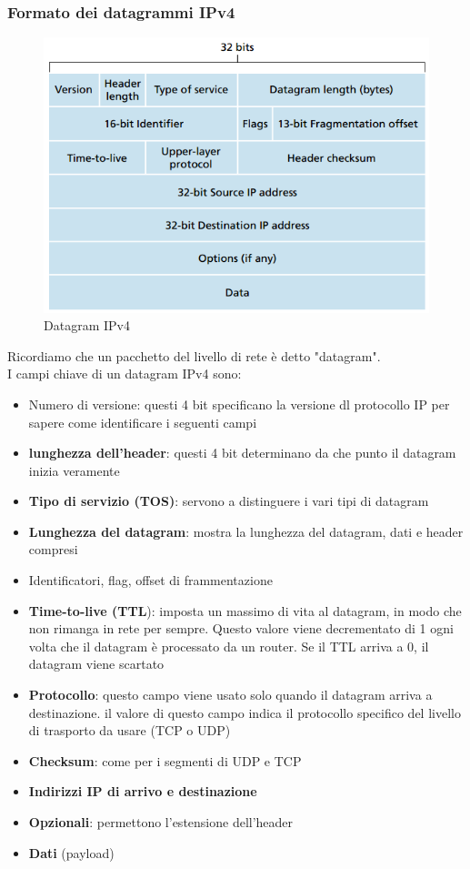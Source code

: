 \documentclass[11pt,a4paper]{article}
\begin{document}
\subsubsection{Formato dei datagrammi IPv4}
\begin{figure}
	\includegraphics[scale=0.6]{img/052.png}
	\caption{Datagram IPv4}
\end{figure}
Ricordiamo che un pacchetto del livello di rete è detto "datagram". \\
I campi chiave di un datagram IPv4 sono:
\begin{itemize}
	\item Numero di versione: questi 4 bit specificano la versione dl protocollo IP per sapere come identificare i seguenti campi
	\item \textbf{lunghezza dell'header}: questi 4 bit determinano da che punto il datagram inizia veramente
	\item \textbf{Tipo di servizio (TOS)}: servono a distinguere i vari tipi di datagram
	\item\textbf{ Lunghezza del datagram}: mostra la lunghezza del datagram, dati e header compresi
	\item Identificatori, flag, offset di frammentazione
	\item \textbf{Time-to-live (TTL}): imposta un massimo di vita al datagram, in modo che non rimanga in rete per sempre. Questo valore viene decrementato di 1 ogni volta che il datagram è processato da un router. Se il TTL arriva a 0, il datagram viene scartato
	\item \textbf{Protocollo}: questo campo viene usato solo quando il datagram arriva a destinazione. il valore di questo campo indica il protocollo specifico del livello di trasporto da usare (TCP o UDP)
	\item \textbf{Checksum}: come per i segmenti di UDP e TCP
	\item \textbf{Indirizzi IP di arrivo e destinazione}
	\item \textbf{Opzionali}: permettono l'estensione dell'header
	\item \textbf{Dati} (payload)
\end{itemize}
\end{document}
